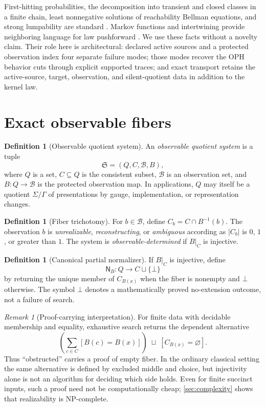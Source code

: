 \documentclass[11pt]{article}
\theoremstyle{definition}
\newtheorem{definition}[theorem]{Definition}
\theoremstyle{remark}
\newtheorem{remark}[theorem]{Remark}
\numberwithin{equation}{section}
\newcommand{\cB}{\mathcal B}
\begin{document}
First-hitting probabilities, the decomposition into transient and closed
classes in a finite chain, least nonnegative solutions of reachability Bellman
equations, and strong lumpability are standard
\citep{Norris1997,KemenySnell1976,BaierKatoen2008}.  Markov functions and
intertwining provide neighboring language for law pushforward
\citep{RogersPitman1981}.  We use these facts without a novelty claim.  Their
role here is architectural: declared active sources and a protected
observation index four separate failure modes; those modes recover the
OPH behavior cuts through explicit supported traces; and exact
transport retains the active-source, target, observation, and silent-quotient
data in addition to the kernel law.

\section{Exact observable fibers}\label{sec:exact}

\begin{definition}[Observable quotient system]
An \emph{observable quotient system} is a tuple
\[
 \mathfrak S=(Q,C,\cB,B),
\]
where $Q$ is a set, $C\subseteq Q$ is the consistent subset, $\cB$ is an observation set, and $B:Q\to\cB$ is the protected observation map.  In applications, $Q$ may itself be a quotient $\Sigma/\Gamma$ of presentations by gauge, implementation, or representation changes.
\end{definition}

\begin{definition}[Fiber trichotomy]
For $b\in\cB$, define $C_b=C\cap B^{-1}(b)$.  The observation $b$ is \emph{unrealizable}, \emph{reconstructing}, or \emph{ambiguous} according as $|C_b|$ is $0$, $1$, or greater than $1$.  The system is \emph{observable-determined} if $B|_C$ is injective.
\end{definition}

\begin{definition}[Canonical partial normalizer]
If $B|_C$ is injective, define
\[
 \mathsf N_B:Q\longrightarrow C\sqcup\{\bot\}
\]
by returning the unique member of $C_{B(x)}$ when the fiber is nonempty and $\bot$ otherwise.  The symbol $\bot$ denotes a mathematically proved no-extension outcome, not a failure of search.
\end{definition}

\begin{remark}[Proof-carrying interpretation]
For finite data with decidable membership and equality, exhaustive search
returns the dependent alternative
\[
 \left(\sum_{c\in C} [B(c)=B(x)]\right)
 \;\sqcup\;
 [C_{B(x)}=\varnothing].
\]
Thus \enquote{obstructed} carries a proof of empty fiber.  In the ordinary
classical setting the same alternative is defined by excluded middle and
choice, but injectivity alone is not an algorithm for deciding which side
holds.  Even for finite succinct inputs, such a proof need not be
computationally cheap; \cref{sec:complexity} shows that realizability is
NP-complete.
\end{remark}
\end{document}
